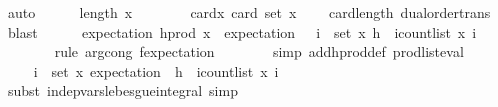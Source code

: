 \begin{isabellebody}
\ auto\isanewline
\ \ \ \ \isamarkupfalse%
\ {\isachardoublequoteopen}length\ x\ {\isasymle}\ {}{\isachardoublequoteclose}\isanewline
\ \ \ \ \isamarkupfalse%
\ card{\isacharunderscore}{\kern0pt}x{\isacharcolon}{\kern0pt}\ {\isachardoublequoteopen}card\ {\isacharparenleft}{\kern0pt}set\ x{\isacharparenright}{\kern0pt}\ {\isasymle}\ {}{\isachardoublequoteclose}\ \isamarkupfalse%
\ card{\isacharunderscore}{\kern0pt}length\ dual{\isacharunderscore}{\kern0pt}order{\isachardot}{\kern0pt}trans\ \isamarkupfalse%
\ blast\isanewline
\isanewline
\ \ \ \ \isamarkupfalse%
\ {\isachardoublequoteopen}expectation\ {\isacharparenleft}{\kern0pt}h{\isacharunderscore}{\kern0pt}prod\ x{\isacharparenright}{\kern0pt}\ {\isacharequal}{\kern0pt}\ expectation\ {\isacharparenleft}{\kern0pt}{\isasymlambda}{\isasymomega}{\isachardot}{\kern0pt}\ {\isasymProd}\ i\ {\isasymin}\ set\ x{\isachardot}{\kern0pt}\ h\ {\isasymomega}\ i{\isacharcircum}{\kern0pt}{\isacharparenleft}{\kern0pt}count{\isacharunderscore}{\kern0pt}list\ x\ i{\isacharparenright}{\kern0pt}{\isacharparenright}{\kern0pt}{\isachardoublequoteclose}\isanewline
\ \ \ \ \ \ \isamarkupfalse%
\ {\isacharparenleft}{\kern0pt}rule\ arg{\isacharunderscore}{\kern0pt}cong{\isacharbrackleft}{\kern0pt}\ f{\isacharequal}{\kern0pt}{\isachardoublequoteopen}expectation{\isachardoublequoteclose}{\isacharbrackright}{\kern0pt}{\isacharparenright}{\kern0pt}\isanewline
\ \ \ \ \ \ \isamarkupfalse%
\ {\isacharparenleft}{\kern0pt}simp\ add{\isacharcolon}{\kern0pt}h{\isacharunderscore}{\kern0pt}prod{\isacharunderscore}{\kern0pt}def\ prod{\isacharunderscore}{\kern0pt}list{\isacharunderscore}{\kern0pt}eval{\isacharparenright}{\kern0pt}\isanewline
\ \ \ \ \isamarkupfalse%
\ \isamarkupfalse%
\ {\isachardoublequoteopen}{\isachardot}{\kern0pt}{\isachardot}{\kern0pt}{\isachardot}{\kern0pt}\ {\isacharequal}{\kern0pt}\ {\isacharparenleft}{\kern0pt}{\isasymProd}i\ {\isasymin}\ set\ x{\isachardot}{\kern0pt}\ expectation\ {\isacharparenleft}{\kern0pt}{\isasymlambda}{\isasymomega}{\isachardot}{\kern0pt}\ h\ {\isasymomega}\ i{\isacharcircum}{\kern0pt}{\isacharparenleft}{\kern0pt}count{\isacharunderscore}{\kern0pt}list\ x\ i{\isacharparenright}{\kern0pt}{\isacharparenright}{\kern0pt}{\isacharparenright}{\kern0pt}{\isachardoublequoteclose}\isanewline
\ \ \ \ \ \ \isamarkupfalse%
\ {\isacharparenleft}{\kern0pt}subst\ indep{\isacharunderscore}{\kern0pt}vars{\isacharunderscore}{\kern0pt}lebesgue{\isacharunderscore}{\kern0pt}integral{\isacharcomma}{\kern0pt}\ simp{\isacharparenright}{\kern0pt}\isanewline

\end{isabellebody}
